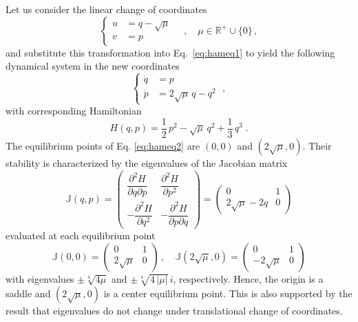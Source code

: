 \documentclass{ws-ijbc}
\begin{document}
Let us consider the linear change of coordinates
\begin{equation}
\left\{
\begin{aligned}
u & = q - \sqrt{\mu} \\
v & = p
\end{aligned}
\right. \quad , \quad \mu \in \mathbb{R}^{+} \cup \lbrace0\rbrace \, ,
\end{equation}
and substitute this transformation into Eq.~\eqref{eq:hameq1} to yield the following dynamical system in the new coordinates
\begin{equation}
\left\{
\begin{aligned}
\dot{q} & = p \\
\dot{p} & = 2  \sqrt{\mu} \, q - q^2
\end{aligned}
\right. \; ,
\label{eq:hameq2}
\end{equation}
with corresponding Hamiltonian
\begin{equation}
H(q,p) = \frac{1}{2} \, p^2 - \sqrt{\mu} \, q^2 + \frac{1}{3} \, q^3 \;.
\label{eq:ham_saddle_origin_1dof}
\end{equation}
The equilibrium points of Eq. \eqref{eq:hameq2} are $(0,0)$ and $(2 \sqrt{\mu}, 0)$. Their stability is characterized by the eigenvalues of the Jacobian matrix
\begin{equation}
\mathbb{J}(q,p) = 
\begin{pmatrix}
\dfrac{\partial^2 H}{\partial q \partial p} & \dfrac{\partial^2 H}{\partial p^2} \\[.3cm]
-\dfrac{\partial^2 H}{\partial q^2} & -\dfrac{\partial^2 H}{\partial p \partial q}
\end{pmatrix} = 
\begin{pmatrix}
0 & 1 \\
2 \sqrt{\mu} -2 q  & 0
\end{pmatrix}
\end{equation}
evaluated at each equilibrium point
\begin{equation}
\mathbb{J}(0,0) = 
\begin{pmatrix}
0 & 1 \\
2 \sqrt{\mu}  & 0
\end{pmatrix} 
\,,\quad 
\mathbb{J}(2\sqrt{\mu},0) = 
\begin{pmatrix}
0 & 1 \\
-2 \sqrt{\mu}  & 0
\end{pmatrix} 
\end{equation}
with eigenvalues $\pm \sqrt[4]{4\mu}$ and $\pm \sqrt[4]{4 \, |\mu|} \, i$, respectively. Hence, the origin is a saddle and $(2\sqrt{\mu},0)$ is a center equilibrium point. This is also supported by the result that eigenvalues do not change under translational change of coordinates.
\end{document}
